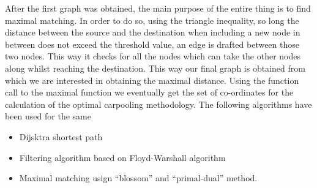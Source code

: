 \documentclass[main.tex]{subfiles}
\begin{document}
After the first graph was obtained, the main purpose of the entire thing is to
find maximal matching. In order to do so, using the triangle inequality, so long
the distance between the source and the destination when including a new node in
between does not exceed the threshold value, an edge is drafted between those
two nodes. This way it checks for all the nodes which can take the other nodes
along whilst reaching the destination.
This way our final graph is obtained from which we are interested in obtaining
the maximal distance. Using the function call to the maximal function we
eventually get the set of co-ordinates for the calculation of the optimal
carpooling methodology.
The following algorithms have been used for the same
\begin{itemize}
  \item Dijsktra shortest path
  \item Filtering algorithm based on Floyd-Warshall algorithm
  \item Maximal matching usign ``blossom'' and ``primal-dual'' method.
\end{itemize}
\end{document}
